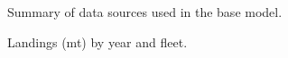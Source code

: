 \documentclass[
]{scrartcl}
\begin{document}
\begin{figure}


\caption{\label{fig-data}Summary of data sources used in the base
model.}

\end{figure}%

\begin{figure}


\caption{\label{fig-catch}Landings (mt) by year and fleet.}

\end{figure}%
\end{document}
